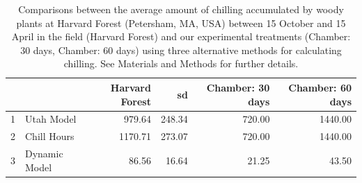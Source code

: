 \documentclass{article}\usepackage[]{graphicx}\usepackage[]{color}
\begin{document}
\begin{table}[ht]
\centering
\begin{tabular}{rlrrrr}
  \hline
 &  & Harvard Forest & sd & Chamber: 30 days & Chamber: 60 days \\ 
  \hline
1 & Utah Model & 979.64 & 248.34 & 720.00 & 1440.00 \\ 
  2 & Chill Hours & 1170.71 & 273.07 & 720.00 & 1440.00 \\ 
  3 & Dynamic Model & 86.56 & 16.64 & 21.25 & 43.50 \\ 
   \hline
\end{tabular}
\caption{Comparisons between the average amount of chilling accumulated by woody plants at Harvard Forest (Petersham, MA, USA) between 15 October and 15 April in the field (Harvard Forest) and our experimental treatments (Chamber: 30 days, Chamber: 60 days)  using three alternative methods for calculating chilling. See Materials and Methods for further details.} 
\label{tab:chillcomps}
\end{table}
\end{document}
